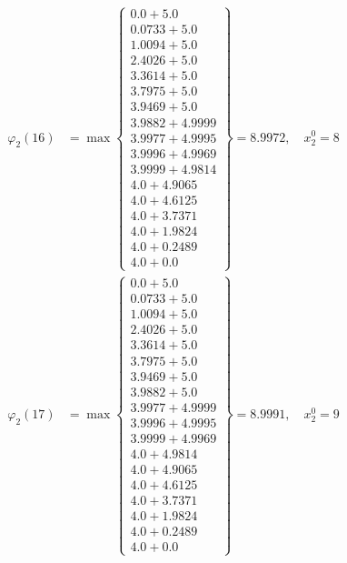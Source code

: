 \documentclass{article}
\begin{document}
\begin{align*}
\varphi_{2}(16) &= \max \left\{ \begin{array}{c}
0.0 + 5.0 \\
 0.0733 + 5.0 \\
 1.0094 + 5.0 \\
 2.4026 + 5.0 \\
 3.3614 + 5.0 \\
 3.7975 + 5.0 \\
 3.9469 + 5.0 \\
 3.9882 + 4.9999 \\
 3.9977 + 4.9995 \\
 3.9996 + 4.9969 \\
 3.9999 + 4.9814 \\
 4.0 + 4.9065 \\
 4.0 + 4.6125 \\
 4.0 + 3.7371 \\
 4.0 + 1.9824 \\
 4.0 + 0.2489 \\
 4.0 + 0.0
\end{array} \right\}=8.9972, \quad x_{2}^0=8\\
  
\varphi_{2}(17) &= \max \left\{ \begin{array}{c}
0.0 + 5.0 \\
 0.0733 + 5.0 \\
 1.0094 + 5.0 \\
 2.4026 + 5.0 \\
 3.3614 + 5.0 \\
 3.7975 + 5.0 \\
 3.9469 + 5.0 \\
 3.9882 + 5.0 \\
 3.9977 + 4.9999 \\
 3.9996 + 4.9995 \\
 3.9999 + 4.9969 \\
 4.0 + 4.9814 \\
 4.0 + 4.9065 \\
 4.0 + 4.6125 \\
 4.0 + 3.7371 \\
 4.0 + 1.9824 \\
 4.0 + 0.2489 \\
 4.0 + 0.0
\end{array} \right\}=8.9991, \quad x_{2}^0=9\\
  

\end{align*}
\end{document}
